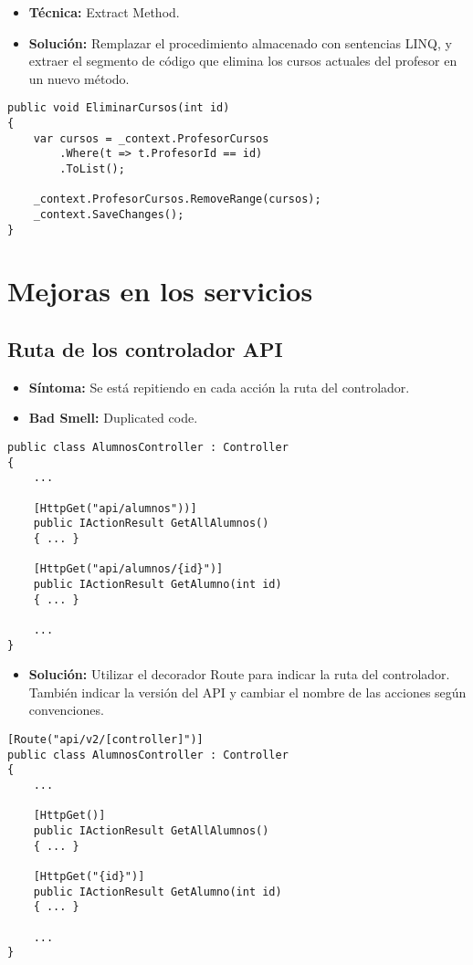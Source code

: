 \begin{itemize}
	\item \textbf{Técnica:} Extract Method.
	\item \textbf{Solución:} Remplazar el procedimiento almacenado con sentencias LINQ, y extraer el segmento de código que elimina los cursos actuales del profesor en un nuevo método.
\end{itemize}

\begin{lstlisting}[language={[Sharp]C}]
public void EliminarCursos(int id)
{
	var cursos = _context.ProfesorCursos
		.Where(t => t.ProfesorId == id)
		.ToList();
	
	_context.ProfesorCursos.RemoveRange(cursos);
	_context.SaveChanges();
}
\end{lstlisting}
	

\section{Mejoras en los servicios}

\subsection{Ruta de los controlador API}
\begin{itemize}
	\item \textbf{Síntoma:} Se está repitiendo en cada acción la ruta del controlador.
	\item \textbf{Bad Smell:} Duplicated code.
\end{itemize}

\begin{lstlisting}[language={[Sharp]C}]
public class AlumnosController : Controller
{
	...	
	
	[HttpGet("api/alumnos"))]
	public IActionResult GetAllAlumnos()
	{ ... }
	
	[HttpGet("api/alumnos/{id}")]
	public IActionResult GetAlumno(int id)
	{ ... }
	
	...
}
\end{lstlisting}

\begin{itemize}	
	\item \textbf{Solución:} Utilizar el decorador Route para indicar la ruta del controlador. También indicar la versión del API y cambiar el nombre de las acciones según convenciones.
\end{itemize}

\begin{lstlisting}[language={[Sharp]C}]
[Route("api/v2/[controller]")]
public class AlumnosController : Controller
{
	...	
	
	[HttpGet()]
	public IActionResult GetAllAlumnos()
	{ ... }
	
	[HttpGet("{id}")]
	public IActionResult GetAlumno(int id)
	{ ... }
	
	...
}
\end{lstlisting}

